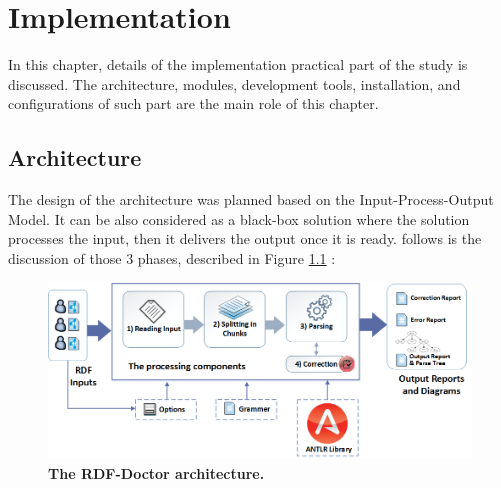 \chapter{Implementation}
\label{ch:implementation}


In this chapter, details of the implementation practical part of the study is discussed. The architecture, modules, development tools, installation, and configurations of such part are the main role of this chapter.  
 
\section {Architecture}
The design of the architecture was planned based on the Input-Process-Output Model. It can be also considered as a black-box solution where the solution processes the input, then it delivers the output once it is ready. follows is the discussion of those 3 phases, described in Figure \ref{Fig:Architecture} : 
 \begin{figure}[H]
	\begin{center}
		\includegraphics[scale=0.5]{images/Architecture}
		\setlength\belowcaptionskip{-7mm}
		\caption{\textbf{The RDF-Doctor architecture.}}
		\label{Fig:Architecture}
	\end{center}
\end{figure}

